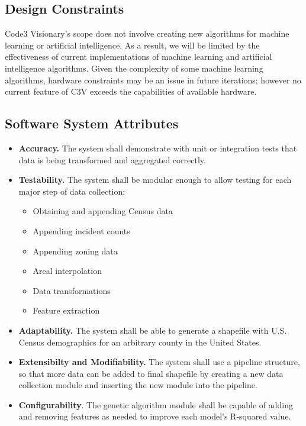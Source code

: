 \documentclass[onecolumn, draftclsnofoot,10pt, compsoc]{IEEEtran}
\begin{document}
    \subsection{Design Constraints}
    Code3 Visionary's scope does not involve creating new algorithms for machine learning or artificial intelligence.
    As a result, we will be limited by the effectiveness of current implementations of machine learning and artificial intelligence algorithms.
    Given the complexity of some machine learning algorithms, hardware constraints may be an issue in future iterations; however no current feature of C3V exceeds the capabilities of available hardware.
    
    \subsection{Software System Attributes}
    \begin{itemize}
    \item \textbf{Accuracy.} The system shall demonstrate with unit or integration tests that data is being transformed and aggregated correctly.
    \item \textbf{Testability.} The system shall be modular enough to allow testing for each major step of data collection: 
        \begin{itemize}
            \item Obtaining and appending Census data
            \item Appending incident counts
            \item Appending zoning data
            \item Areal interpolation
            \item Data transformations
            \item Feature extraction
        \end{itemize}
    \item \textbf{Adaptability.} The system shall be able to generate a shapefile with U.S. Census demographics for an arbitrary county in the United States. 
    \item \textbf{Extensibilty and Modifiability.} The system shall use a pipeline structure, so that more data can be added to final shapefile by creating a new data collection module and inserting the new module into the pipeline. 
    \item \textbf{Configurability}. The genetic algorithm module shall be capable of adding and removing features as needed to improve each model's R-squared value.
    \end{itemize}
    
\printindex

    
\end{document}
